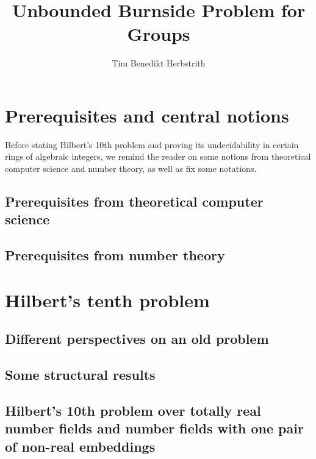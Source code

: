 \documentclass[10pt,a4paper]{scrbook}
\author{Tim Benedikt Herbstrith}
\title{Unbounded Burnside Problem for Groups}
\numberwithin{equation}{section}
\begin{document}

\allowdisplaybreaks

\frontmatter



\mainmatter

\chapter{Prerequisites and central notions}

Before stating Hilbert's 10th problem and proving its undecidability in
certain rings of algebraic integers, we remind the reader on some
notions from theoretical computer science and number theory, as well as
fix some notations.

\section{Prerequisites from theoretical computer science}


\section{Prerequisites from number theory}


\chapter{Hilbert's tenth problem}

\section{Different perspectives on an old problem}


\section{Some structural results}


\section{Hilbert's 10th problem over totally real number fields and number fields with one pair of non-real embeddings}

\end{document}
